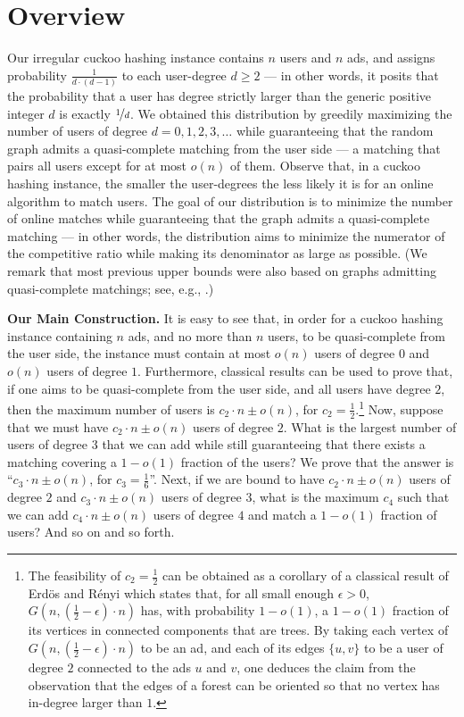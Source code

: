 \documentclass[11pt]{article}
\begin{document}
\section{Overview}\label{sec:overview}
Our irregular cuckoo hashing instance contains $n$ users and $n$ ads, and assigns probability $\frac1{d \cdot (d-1)}$ to each user-degree $d \ge 2$ --- in other words, it posits that the probability that a user has degree strictly larger than the generic positive integer $d$ is exactly $\nicefrac1d$.
We obtained this distribution by greedily maximizing the number of users of degree $d =0,1,2,3,\ldots$ while guaranteeing that the random graph admits a quasi-complete matching from the user side --- a matching that pairs all users except for at most $o(n)$ of them. Observe that, in a cuckoo hashing instance, the smaller the user-degrees the less likely it is for an online algorithm to match users. The goal of our distribution is to minimize the number of online matches while guaranteeing that the graph admits a quasi-complete matching --- in other words, the distribution aims to minimize the numerator of the competitive ratio while making its denominator as large as possible. (We remark that most previous upper bounds were also based on  graphs admitting quasi-complete matchings; see, e.g., \cite{bk10,mos11,gm08,kvv90}.) 

\smallskip

{\bf Our Main Construction.} It is easy to see that, in order for a  cuckoo hashing instance containing $n$ ads, and no more than $n$ users, to be quasi-complete from the user side, the instance must contain at most $o(n)$ users of degree $0$ and $o(n)$ users of degree $1$. Furthermore, classical results can be used to prove that, if one aims to be quasi-complete from the user side, and all users have degree $2$, then the maximum number of  users is $c_2 \cdot n \pm o(n)$, for $c_2 = \frac12$.\footnote{The feasibility of $c_2 = \frac12$ can be obtained as a corollary of a classical result of Erd\"os and R\'enyi \cite{er60} which states that, for all small enough $\epsilon > 0$, $G\left(n,\left(\frac12-\epsilon\right)\cdot n\right)$ has, with probability $1-o(1)$, a $1-o(1)$ fraction of its vertices in connected components that are trees. By taking each vertex of $G\left(n,\left(\frac12-\epsilon\right) \cdot n\right)$ to be an ad, and each of its edges $\{u,v\}$ to be a user of degree $2$ connected to the ads $u$  and $v$, one deduces the claim from the observation that the edges of a forest can be oriented so that no vertex has in-degree larger than $1$.} Now, suppose that we must have $c_2 \cdot n \pm o(n)$ users of degree $2$. What is the largest number of users of degree $3$ that we can add while  still guaranteeing that there exists a matching covering a $1-o(1)$ fraction of the users? We  prove that the answer is ``$c_3 \cdot  n \pm o(n)$, for $c_3 = \frac16$''. Next, if we are bound to have $c_2 \cdot n \pm o(n)$ users of degree $2$ and $c_3 \cdot n \pm o(n)$ users of degree $3$, what is the maximum $c_4$ such that we can add $c_4 \cdot n \pm o(n)$ users of degree $4$ and  match a $1-o(1)$ fraction of users? And so on and so forth.
\end{document}
